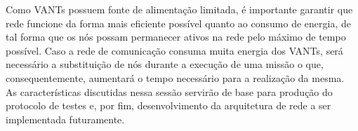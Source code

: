 Como VANTs possuem fonte de alimentação limitada, é importante garantir que rede funcione da forma mais eficiente possível quanto ao consumo de energia, de tal forma que os nós possam permanecer ativos na rede pelo máximo de tempo possível. Caso a rede de comunicação consuma muita energia dos VANTs, será necessário a substituição de nós durante a execução de uma missão o que, consequentemente, aumentará o tempo necessário para a realização da mesma.\\

As características discutidas nessa sessão servirão de base para produção do protocolo de testes e, por fim, desenvolvimento da arquitetura de rede a ser implementada futuramente. 